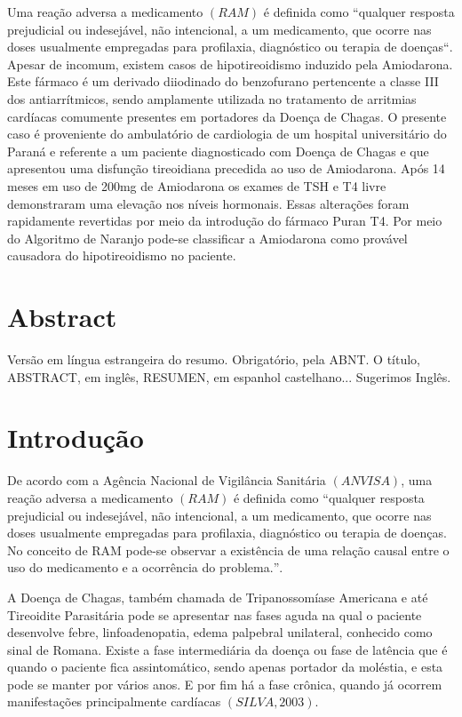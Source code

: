 \documentclass[svgnames,12pt,oneside, openright,a4paper]{scrbook}
\begin{document}
Uma reação adversa a medicamento $(RAM)$ é definida como $“$qualquer resposta prejudicial ou indesejável, não intencional, a um medicamento, que ocorre nas doses usualmente empregadas para profilaxia, diagnóstico ou terapia de doenças$“$. Apesar de incomum, existem casos de hipotireoidismo induzido pela Amiodarona. Este fármaco é um derivado diiodinado do benzofurano pertencente a classe III dos antiarrítmicos, sendo amplamente utilizada no tratamento de arritmias cardíacas comumente presentes em portadores da Doença de Chagas. O presente caso é proveniente do ambulatório de cardiologia de um hospital universitário do Paraná e referente a um paciente diagnosticado com Doença de Chagas e que apresentou uma disfunção tireoidiana precedida ao uso de Amiodarona. Após 14 meses em uso de 200mg de Amiodarona os exames de TSH e T4 livre demonstraram uma elevação nos níveis hormonais. Essas alterações foram rapidamente revertidas por meio da introdução do fármaco Puran T4. Por meio do Algoritmo de Naranjo pode-se classificar a Amiodarona como provável causadora do hipotireoidismo no paciente.  


\chapter*{Abstract}
Versão em língua estrangeira do resumo. Obrigatório, pela ABNT. O título,  ABSTRACT, em inglês, RESUMEN, em espanhol castelhano...
Sugerimos Inglês.

\chapter{Introdução}

De acordo com a Agência Nacional de Vigilância Sanitária $(ANVISA)$, uma reação adversa a medicamento $(RAM)$ é definida como $“$qualquer resposta prejudicial ou indesejável, não intencional, a um medicamento, que ocorre nas doses usualmente empregadas para profilaxia, diagnóstico ou terapia de doenças. No conceito de RAM pode-se observar a existência de uma relação causal entre o uso do medicamento e a ocorrência do problema.$”$.  
 
A Doença de Chagas, também chamada de Tripanossomíase Americana e até Tireoidite Parasitária pode se apresentar nas fases aguda na qual o paciente desenvolve febre, linfoadenopatia, edema palpebral unilateral, conhecido como sinal de Romana. Existe a fase intermediária da doença ou fase de latência que é quando o paciente fica assintomático, sendo apenas portador da moléstia, e esta pode se manter por vários anos. E por fim há a fase crônica, quando já ocorrem manifestações principalmente cardíacas $(SILVA, 2003)$. 
\end{document}
